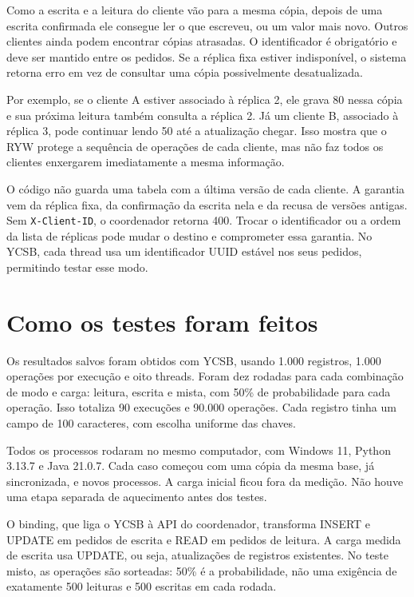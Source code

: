 Como a escrita e a leitura do cliente vão para a mesma cópia, depois de uma
escrita confirmada ele consegue ler o que escreveu, ou um valor mais novo.
Outros clientes ainda podem encontrar cópias atrasadas. O identificador é
obrigatório e deve ser mantido entre os pedidos. Se a réplica fixa estiver
indisponível, o sistema retorna erro em vez de consultar uma cópia possivelmente
desatualizada.

Por exemplo, se o cliente A estiver associado à réplica 2, ele grava 80 nessa
cópia e sua próxima leitura também consulta a réplica 2. Já um cliente B,
associado à réplica 3, pode continuar lendo 50 até a atualização chegar.
Isso mostra que o RYW protege a sequência de operações de cada cliente,
mas não faz todos os clientes enxergarem imediatamente a mesma informação.

O código não guarda uma tabela com a última versão de cada cliente. A
garantia vem da réplica fixa, da confirmação da escrita nela e da recusa
de versões antigas. Sem \texttt{X-Client-ID}, o coordenador retorna 400.
Trocar o identificador ou a ordem da lista de réplicas pode mudar o destino
e comprometer essa garantia. No YCSB, cada thread usa um identificador UUID
estável nos seus pedidos, permitindo testar esse modo.

\section{Como os testes foram feitos}
Os resultados salvos foram obtidos com YCSB, usando 1.000 registros,
1.000 operações por execução e oito threads. Foram dez rodadas para cada
combinação de modo e carga: leitura, escrita e mista, com 50\% de probabilidade
para cada operação. Isso totaliza 90 execuções e 90.000 operações.
Cada registro tinha um campo de 100 caracteres, com escolha uniforme das chaves.

Todos os processos rodaram no mesmo computador, com Windows 11, Python 3.13.7
e Java 21.0.7. Cada caso começou com uma cópia da mesma base, já sincronizada,
e novos processos. A carga inicial ficou fora da medição. Não houve uma etapa
separada de aquecimento antes dos testes.

O binding, que liga o YCSB à API do coordenador, transforma INSERT e UPDATE
em pedidos de escrita e READ em pedidos de leitura. A carga medida de escrita
usa UPDATE, ou seja, atualizações de registros existentes. No teste misto,
as operações são sorteadas: 50\% é a probabilidade, não uma exigência de
exatamente 500 leituras e 500 escritas em cada rodada.

